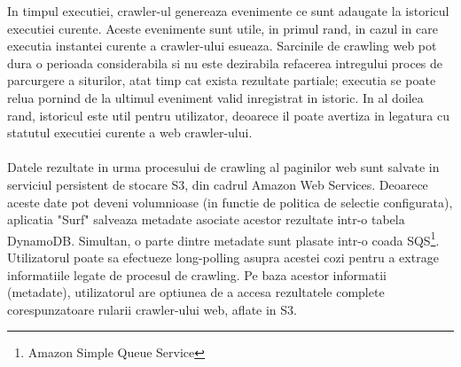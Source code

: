 In timpul executiei, crawler-ul genereaza evenimente ce sunt adaugate la istoricul executiei curente. Aceste evenimente sunt utile, in primul rand, in cazul in care executia instantei curente a crawler-ului esueaza. Sarcinile de crawling web pot dura o perioada considerabila si nu este dezirabila refacerea intregului proces de parcurgere a siturilor, atat timp cat exista rezultate partiale; executia se poate relua pornind de la ultimul eveniment valid inregistrat in istoric.  In al doilea rand, istoricul este util pentru utilizator, deoarece il poate avertiza in legatura cu statutul executiei curente a web crawler-ului.
\\
\\
Datele rezultate in urma procesului de crawling al paginilor web sunt salvate in serviciul persistent de stocare S3, din cadrul Amazon Web Services. Deoarece aceste date pot deveni volumnioase (in functie de politica de selectie configurata), aplicatia "Surf" salveaza metadate asociate acestor rezultate intr-o tabela DynamoDB. Simultan, o parte dintre metadate sunt plasate intr-o coada SQS\footnote{Amazon Simple Queue Service}. Utilizatorul poate sa efectueze long-polling asupra acestei cozi pentru a extrage informatiile legate de procesul de crawling. Pe baza acestor informatii (metadate), utilizatorul are optiunea de a accesa rezultatele complete corespunzatoare rularii crawler-ului web, aflate in S3.